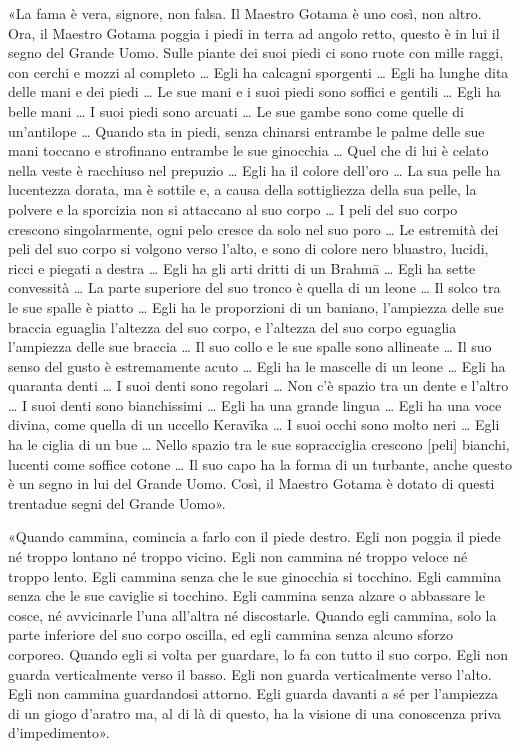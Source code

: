 «La fama è vera, signore, non falsa. Il Maestro Gotama è uno così, non altro.
Ora, il Maestro Gotama poggia i piedi in terra ad angolo retto, questo è in lui
il segno del Grande Uomo. Sulle piante dei suoi piedi ci sono ruote con mille
raggi, con cerchi e mozzi al completo … Egli ha calcagni sporgenti … Egli ha
lunghe dita delle mani e dei piedi … Le sue mani e i suoi piedi sono soffici e
gentili … Egli ha belle mani … I suoi piedi sono arcuati … Le sue gambe sono
come quelle di un’antilope … Quando sta in piedi, senza chinarsi entrambe le
palme delle sue mani toccano e strofinano entrambe le sue ginocchia … Quel che
di lui è celato nella veste è racchiuso nel prepuzio … Egli ha il colore
dell’oro … La sua pelle ha lucentezza dorata, ma è sottile e, a causa della
sottigliezza della sua pelle, la polvere e la sporcizia non si attaccano al suo
corpo … I peli del suo corpo crescono singolarmente, ogni pelo cresce da solo
nel suo poro … Le estremità dei peli del suo corpo si volgono verso l’alto, e
sono di colore nero bluastro, lucidi, ricci e piegati a destra … Egli ha gli
arti dritti di un Brahmā … Egli ha sette convessità … La parte superiore del suo
tronco è quella di un leone … Il solco tra le sue spalle è piatto … Egli ha le
proporzioni di un baniano, l’ampiezza delle sue braccia eguaglia l’altezza del
suo corpo, e l’altezza del suo corpo eguaglia l’ampiezza delle sue braccia … Il
suo collo e le sue spalle sono allineate … Il suo senso del gusto è estremamente
acuto … Egli ha le mascelle di un leone … Egli ha quaranta denti … I suoi denti
sono regolari … Non c’è spazio tra un dente e l’altro … I suoi denti sono
bianchissimi … Egli ha una grande lingua … Egli ha una voce divina, come quella
di un uccello Keravīka … I suoi occhi sono molto neri … Egli ha le ciglia di un
bue … Nello spazio tra le sue sopracciglia crescono [peli] bianchi, lucenti come
soffice cotone … Il suo capo ha la forma di un turbante, anche questo è un segno
in lui del Grande Uomo. Così, il Maestro Gotama è dotato di questi trentadue
segni del Grande Uomo».

«Quando cammina, comincia a farlo con il piede destro. Egli non poggia il piede
né troppo lontano né troppo vicino. Egli non cammina né troppo veloce né troppo
lento. Egli cammina senza che le sue ginocchia si tocchino. Egli cammina senza
che le sue caviglie si tocchino. Egli cammina senza alzare o abbassare le cosce,
né avvicinarle l’una all’altra né discostarle. Quando egli cammina, solo la
parte inferiore del suo corpo oscilla, ed egli cammina senza alcuno sforzo
corporeo. Quando egli si volta per guardare, lo fa con tutto il suo corpo. Egli
non guarda verticalmente verso il basso. Egli non guarda verticalmente verso
l’alto. Egli non cammina guardandosi attorno. Egli guarda davanti a sé per
l’ampiezza di un giogo d’aratro ma, al di là di questo, ha la visione di una
conoscenza priva d’impedimento».

